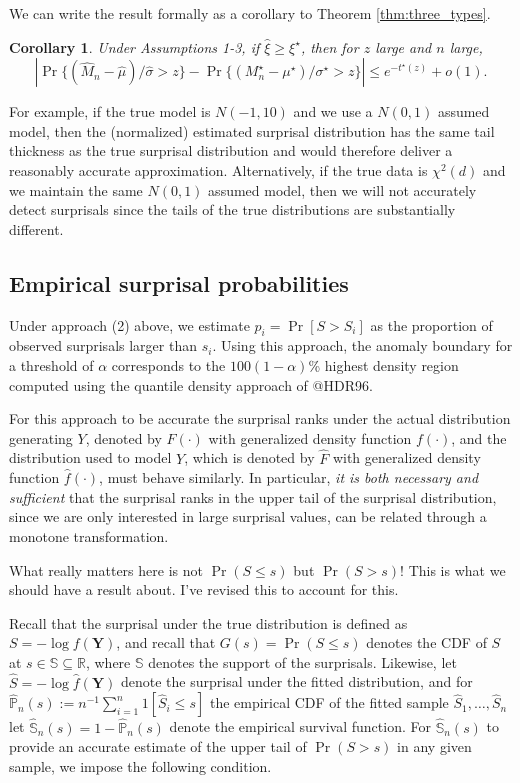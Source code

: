 \documentclass[a4paper,11pt]{article}
\newtheorem{corollary}{Corollary}
\begin{document}
We can write the result formally as a corollary to Theorem \ref{thm:three_types}. 
\begin{corollary}\label{corr:new_corr}
Under Assumptions 1-3, if $\hat\xi\ge \xi^\star$,  then for $z$ large and $n$ large,   
$$
\left|\Pr\{(\hat{M}_n-\hat\mu)/\hat\sigma>z\}-\Pr\{(M^\star_n-\mu^\star)/\sigma^\star>z\}\right|\le e^{-t^\star(z)}+o(1).
$$
\end{corollary}



For example, if the true model is $N(-1,10)$ and we use a $N(0,1)$ assumed model, then the (normalized) estimated surprisal distribution has the same tail thickness as the true surprisal distribution and would therefore deliver a reasonably accurate approximation. Alternatively, if the true data is $\chi^2(d)$ and we maintain the same $N(0,1)$ assumed model, then we will not accurately detect surprisals since the tails of the true distributions are substantially different. 


\newpage

\subsection{Empirical surprisal probabilities}

Under approach (2) above, we estimate $p_i=\Pr[S> S_i]$ as the proportion of observed surprisals larger than $s_i$. Using this approach, the anomaly boundary for a threshold of $\alpha$ corresponds to the $100(1-\alpha)$\% highest density region computed using the quantile density approach of @HDR96.

For this approach to be accurate the surprisal ranks under the actual distribution generating $Y$, denoted by $F(\cdot)$ with generalized density function $f(\cdot)$, and the distribution used to model $Y$, which is denoted by $\widehat{F}$ with generalized density function $\widehat{f}(\cdot)$, must behave similarly. In particular, \textit{it is both necessary and sufficient} that the surprisal ranks in the upper tail of the surprisal distribution, since we are only interested in large surprisal values,  can be related through a monotone transformation.

{\color{blue} What really matters here is not $\Pr(S\le s)$ but $\Pr(S>s)$! This is what we should have a result about. I've revised this to account for this. }

Recall that the surprisal under the true distribution is defined as $S=-\log f(\bm{Y})$, and recall that $G(s)=\Pr(S\le s)$ denotes the CDF of $S$ at $s\in\mathbb{S}\subseteq\mathbb{R}$, where $\mathbb{S}$ denotes the support of the surprisals. Likewise, let $\widehat{S}=-\log \widehat{f}(\bm{Y})$ denote the surprisal under the fitted distribution, and for $\widehat{\mathbb{P}}_n(s):=n^{-1}\sum_{i=1}^{n}1[\widehat{S}_i\le s]$ the empirical CDF of the fitted sample $\widehat{S}_1,\dots,\widehat{S}_n$ let $\widehat{\mathbb{S}}_n(s)=1-\widehat{\mathbb{P}}_n(s)$ denote the empirical survival function. For $\widehat{\mathbb{S}}_n(s)$ to provide an accurate estimate of the upper tail of $\Pr(S> s)$ in any given sample, we impose the following condition.
\end{document}

